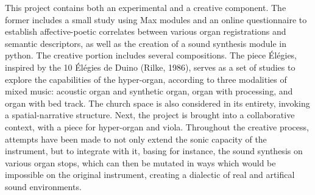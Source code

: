 \documentclass[12pt,twoside,maitrise]{dms}
\theoremstyle{definition}
\begin{document}
This project contains both an experimental and a creative component. 
The former includes a small study using Max modules and an online questionnaire to establish affective-poetic correlates between various organ registrations and semantic descriptors, as well as the creation of a sound synthesis module in python. 
The creative portion includes several compositions. 
The piece Élégies, inspired by the 10 Élégies de Duino (Rilke, 1986), serves as a set of studies to explore the capabilities of the hyper-organ, according to three modalities of mixed music: acoustic organ and synthetic organ, organ with processing, and organ with bed track. 
The church space is also considered in its entirety, invoking a spatial-narrative structure. 
Next, the project is brought into a collaborative context, with a piece for hyper-organ and viola. 
Throughout the creative process, attempts have been made to not only extend the sonic capacity of the instrument, but to integrate with it, basing for instance, the sound synthesis on various organ stops, which can then be mutated in ways which would be impossible on the original instrument, creating a dialectic of real and artifical sound environments.


\end{document}
